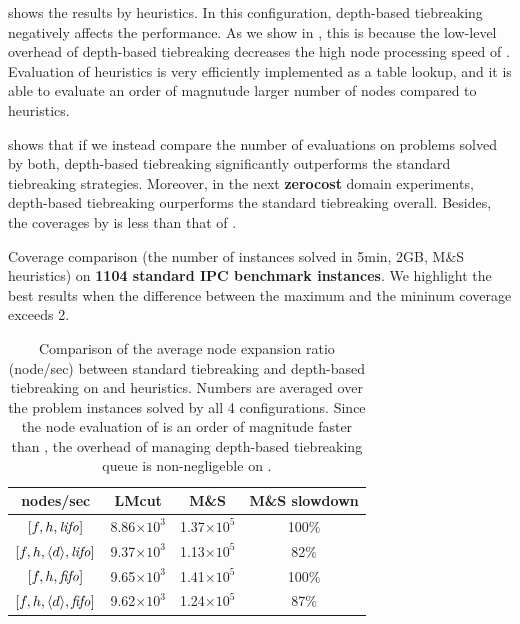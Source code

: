  shows the results by \mands heuristics.
In this configuration, depth-based tiebreaking negatively affects the performance.
As we show in , this is because
the low-level overhead of depth-based tiebreaking decreases the high
node processing speed of \mands. Evaluation of \mands heuristics is
very efficiently implemented as a table lookup, and it is able to
evaluate an order of magnutude larger number of nodes
compared to \lmcut heuristics.

 shows that if we instead compare the
number of evaluations on problems solved by both, depth-based
tiebreaking significantly outperforms the standard tiebreaking
strategies. Moreover, in the next \textbf{zerocost} domain experiments,
depth-based tiebreaking ourperforms the standard tiebreaking
overall. Besides, the coverages by \mands is less than that of \lmcut.

\begin{table}[htbp]
 {
 \centering
 
 \caption{
 Coverage comparison (the number of instances solved in 5min, 2GB, M\&S
 heuristics) on \textbf{1104 standard IPC benchmark instances}. We highlight the
 best results when the difference between the maximum and the mininum coverage exceeds 2.
 }
 \label{tbl:mands-ipc-full}
 }
\end{table}

\begin{table}[htb]
 \centering
 \begin{tabular}{cccc}
  nodes/sec                  & LMcut      & M\&S       & M\&S slowdown\\
  \hline
  $[f,h,{\mbox{\textit{lifo}}}]$              & 8.86$\times 10^3$ & 1.37$\times 10^5$ & 100\%\\
  $[f,h,{\left<d\right>},{\mbox{\textit{lifo}}}]$ & 9.37$\times 10^3$ & 1.13$\times 10^5$ & 82\%\\
  \hline
  $[f,h,{\mbox{\textit{fifo}}}]$              & 9.65$\times 10^3$ & 1.41$\times 10^5$ & 100\%\\
  $[f,h,{\left<d\right>},{\mbox{\textit{fifo}}}]$ & 9.62$\times 10^3$ & 1.24$\times 10^5$ & 87\%\\
  \hline
 \end{tabular}
 \caption{Comparison of the average node expansion ratio (node/sec) between
 standard tiebreaking and depth-based tiebreaking on \lmcut and \mands
 heuristics. Numbers are averaged over the problem instances solved by
 all 4 configurations. Since the node evaluation of \mands is an order of
 magnitude faster than \lmcut, the overhead of managing depth-based
 tiebreaking queue is non-negligeble on \mands.}
 \label{tbl:expansion-ratio}
\end{table}

